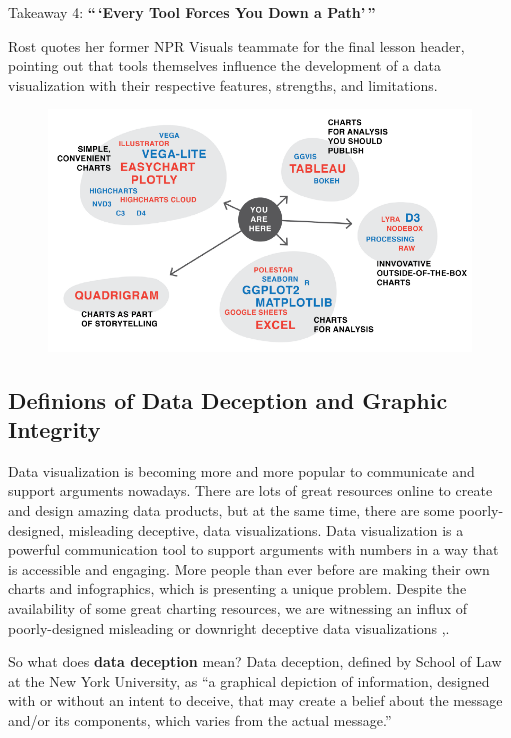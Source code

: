 \documentclass[]{book}
\theoremstyle{definition}
\theoremstyle{definition}
\theoremstyle{definition}
\theoremstyle{remark}
\begin{document}
Takeaway 4: \textbf{``\,`Every Tool Forces You Down a Path'\,''}

Rost quotes her former NPR Visuals teammate for the final lesson header,
pointing out that tools themselves influence the development of a data
visualization with their respective features, strengths, and
limitations.

\begin{figure}
\centering
\includegraphics{images/tools_force_paths.png}
\caption{}
\end{figure}

\subsection{Definions of Data Deception and Graphic
Integrity}\label{definions-of-data-deception-and-graphic-integrity}

Data visualization is becoming more and more popular to communicate and
support arguments nowadays. There are lots of great resources online to
create and design amazing data products, but at the same time, there are
some poorly-designed, misleading deceptive, data visualizations. Data
visualization is a powerful communication tool to support arguments with
numbers in a way that is accessible and engaging. More people than ever
before are making their own charts and infographics, which is presenting
a unique problem. Despite the availability of some great charting
resources, we are witnessing an influx of poorly-designed misleading or
downright deceptive data visualizations
\citep{decept_study},\citep{rose_tint}.

So what does \textbf{data deception} mean? Data deception, defined by
School of Law at the New York University, as ``a graphical depiction of
information, designed with or without an intent to deceive, that may
create a belief about the message and/or its components, which varies
from the actual message.''
\end{document}
